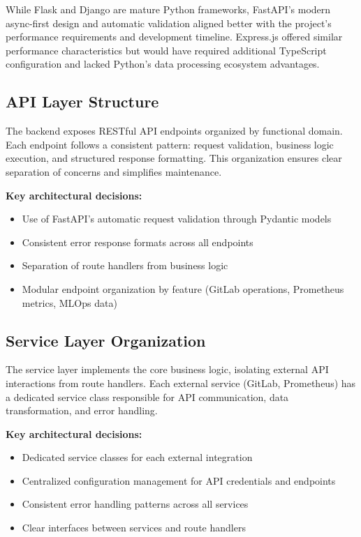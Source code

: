 While Flask and Django are mature Python frameworks, FastAPI's modern async-first design and automatic validation aligned better with the project's performance requirements and development timeline. Express.js offered similar performance characteristics but would have required additional TypeScript configuration and lacked Python's data processing ecosystem advantages.
\subsection{API Layer Structure}

The backend exposes RESTful API endpoints organized by functional domain. Each endpoint follows a consistent pattern: request validation, business logic execution, and structured response formatting. This organization ensures clear separation of concerns and simplifies maintenance.

\textbf{Key architectural decisions:}
\begin{itemize}
    \item Use of FastAPI's automatic request validation through Pydantic models
    \item Consistent error response formats across all endpoints
    \item Separation of route handlers from business logic
    \item Modular endpoint organization by feature (GitLab operations, Prometheus metrics, MLOps data)
\end{itemize}

\subsection{Service Layer Organization}

The service layer implements the core business logic, isolating external API interactions from route handlers. Each external service (GitLab, Prometheus) has a dedicated service class responsible for API communication, data transformation, and error handling.

\textbf{Key architectural decisions:}
\begin{itemize}
    \item Dedicated service classes for each external integration
    \item Centralized configuration management for API credentials and endpoints
    \item Consistent error handling patterns across all services
    \item Clear interfaces between services and route handlers
\end{itemize}

